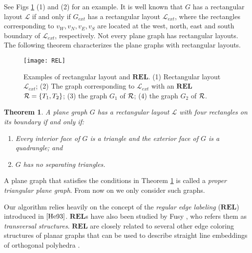 \documentclass[11pt]{article}
\newcommand{\R}{{\cal R}}
\newcommand{\LL}{\mathcal{L}}
\newcommand{\REL}{\mathbf{REL}}
\newtheorem{theorem}[figure]{Theorem}
\begin{document}
See Figs \ref{fig:REL} (1) and (2) for an example.
It is well known \cite{KK85} that
$G$ has a rectangular layout $\LL$ if and only if $G_{ext}$ has a
rectangular layout $\LL_{ext}$, where the rectangles corresponding to
$v_W,v_N,v_E,v_S$ are located at the west, north, east and south boundary
of $\LL_{ext}$, respectively.
Not every plane graph has rectangular layouts. The following
theorem characterizes the plane graphs with rectangular layouts.

\begin{figure}[t]
\begin{center}
\texttt{[image: REL]}
  \centering
\caption{Examples of rectangular layout and $\REL$. (1) Rectangular
layout $\LL_{ext}$; (2) The graph corresponding to $\LL_{ext}$ with
an $\REL$ $\R=\{T_1,T_2\}$; (3) the graph $G_1$ of $\R$; (4) the
graph $G_2$ of $\R$.}
\label{fig:REL}
\end{center}
\end{figure}

\begin{theorem}\label{thm:proper} \cite{KK85}
A plane graph $G$ has a rectangular layout $\LL$ with
four rectangles on its boundary if and only if:
\begin{enumerate}
\item Every interior face of $G$ is a triangle and the exterior face
of $G$ is a quadrangle; and \item $G$ has no separating triangles.
\end{enumerate}
\end{theorem}

A plane graph that satisfies the conditions in Theorem \ref{thm:proper}
is called a {\em proper triangular plane graph}. From now on we
only consider such graphs.

Our algorithm relies heavily on the concept of the \emph{regular edge
labeling} ($\REL$) introduced in $\cite{He93}$. $\REL$s have also been
studied by Fusy \cite{Fu06,Fu09}, who refers them as {\em transversal
structures}. $\REL$ are closely related to several other edge
coloring structures of planar graphs that can be used to describe
straight line embeddings of orthogonal polyhedra \cite{Ep10,EM10}.
\end{document}
